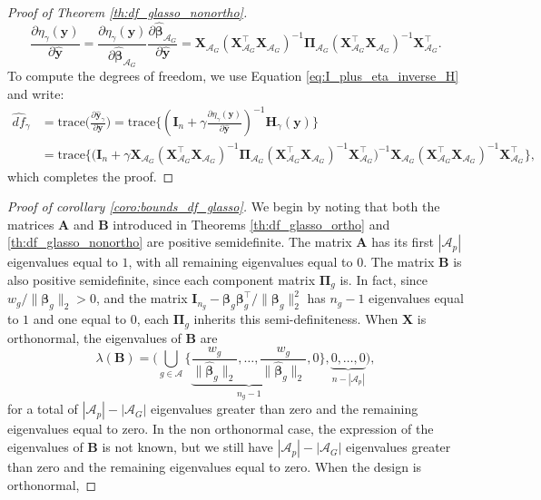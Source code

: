 \documentclass[a4paper, 12pt]{article}
\newcommand{\Aset}{\mathcal{A}}
\newcommand{\betahat}{\widehat{\boldsymbol\beta}}
\newcommand{\trace}{\mathrm{trace}}
\newcommand{\T}{\top}
\def\bbeta{\boldsymbol{\beta}}
\def\bPi{\boldsymbol{\Pi}}
\def\by{\boldsymbol{y}}
\def\bA{\mathbf{A}}
\def\bB{\mathbf{B}}
\def\bH{\mathbf{H}}
\def\bI{\mathbf{I}}
\def\bX{\mathbf{X}}
\def\by{\mathbf{y}}
\begin{document}
\begin{appendix}
\begin{proof}[Proof of Theorem \ref{th:df_glasso_nonortho}]
\begin{equation*}
\frac{\partial\eta_\gamma(\by)}{\partial \widehat{\by}}=\frac{\partial \eta_\gamma(\by)}{\partial\betahat_{\Aset_G}} \frac{\partial\betahat_{\Aset_G}}{\partial \widehat{\by}} = \bX_{\Aset_G}(\bX_{\Aset_G}^{\T}\bX_{\Aset_G})^{-1} \bPi_{\Aset_G} (\bX_{\Aset_G}^{\T}\bX_{\Aset_G})^{-1}\bX_{\Aset_G}^{\T}.
\end{equation*}
To compute the degrees of freedom, we use Equation \eqref{eq:I_plus_eta_inverse_H} and write:
\begin{equation*}
\begin{aligned}
\widehat{df}_\gamma &= \trace \bigg(\frac{\partial \widehat{\by}_\gamma}{\partial\by} \bigg) = \trace \bigg\{\left(\bI_n+\gamma \frac{\partial\eta_\gamma(\by)}{\partial \widehat{\by}}\right)^{-1} \bH_\gamma(\by) \bigg\}\\
&= \trace \bigg\{ \bigg( \bI_n + \gamma \bX_{\Aset_G}(\bX_{\Aset_G}^{\T} \bX_{\Aset_G})^{-1} \bPi_{\Aset_G} (\bX_{\Aset_G}^{\T} \bX_{\Aset_G})^{-1}\bX_{\Aset_G}^{\T} \bigg)^{-1} \bX_{\Aset_G} (\bX_{\Aset_G}^{\T} \bX_{\Aset_G})^{-1}\bX_{\Aset_G}^{\T}  \bigg\},
\end{aligned}
\end{equation*}
which completes the proof.
\end{proof}
%
\begin{proof}[Proof of corollary \ref{coro:bounds_df_glasso}]
We begin by noting that both the matrices $\bA$ and $\bB$ introduced in Theorems \ref{th:df_glasso_ortho} and  \ref{th:df_glasso_nonortho} are positive semidefinite. The matrix $\bA$ has its first  $|\Aset_p|$ eigenvalues equal to $1$, with all remaining eigenvalues equal to $0$. The matrix $\bB$ is also positive semidefinite, since each component matrix $\bPi_g$ is. In fact, since $w_g/\lVert \bbeta_g\rVert_2>0$, and the matrix $\bI_{n_g} - \bbeta_g \bbeta_g^{\T} / \lVert \bbeta_g\rVert_2^2$ has $n_g-1$ eigenvalues equal to $1$ and one equal to $0$, each $\bPi_g$ inherits this semi-definiteness. When $\bX$ is orthonormal, the eigenvalues of $\bB$ are  
\begin{equation*}
\lambda(\bB) = \bigg(\bigcup_{g \in \Aset} \bigg\{ \underbrace{\frac{w_g}{\lVert \widehat{\bbeta}_g \rVert_2}, \ldots, \frac{w_g}{\lVert \widehat{\bbeta}_g \rVert_2}}_{n_g-1}, 0 \bigg\}, \underbrace{0, \ldots, 0 }_{n-|\Aset_p|}\bigg),
\end{equation*}
for a total of $|\Aset_p| - |\Aset_G| $ eigenvalues greater than zero and the remaining eigenvalues equal to zero. In the non orthonormal case, the expression of the eigenvalues of $\bB$ is not known, but we still have $|\Aset_p| - |\Aset_G| $ eigenvalues greater than zero and the remaining eigenvalues equal to zero. When the design is orthonormal,

\end{proof}
\end{appendix}
\end{document}
